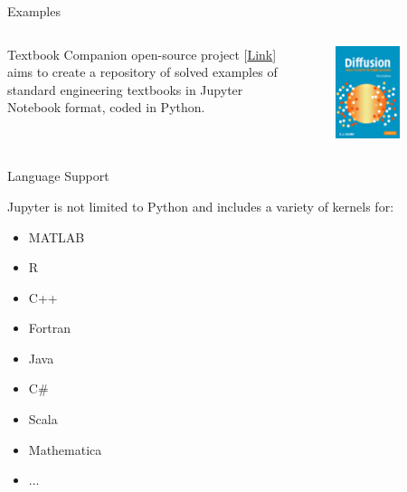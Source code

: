\documentclass[11pt,t]{beamer}
\begin{document}
\begin{frame}[fragile]{Examples}  

	\begin{columns}[t]
		\begin{column}{.5\textwidth}
		Textbook Companion open-source project [\href{https://tbc-python.fossee.in/completed-books/}{Link}] aims to create a repository of solved examples of standard engineering textbooks in Jupyter Notebook format, coded in Python.
	
 
		\end{column}
		\begin{column}{.5\textwidth}
			\vspace{-55pt}
			\begin{figure}
			\centering
			\includegraphics[width=0.70\textwidth]{jupyter_ex_book}
			
			\end{figure}
		\end{column}
	\end{columns}	
		
\end{frame}



\begin{frame}[fragile]{Language Support}  
			
Jupyter is not limited to Python and includes a variety of kernels for:
\begin{itemize}
\item
MATLAB
\item
R
\item
C++
\item
Fortran
\item
Java
\item
C\#
\item
Scala
\item
Mathematica
\item
...
\end{itemize}


\end{frame}
\end{document}
